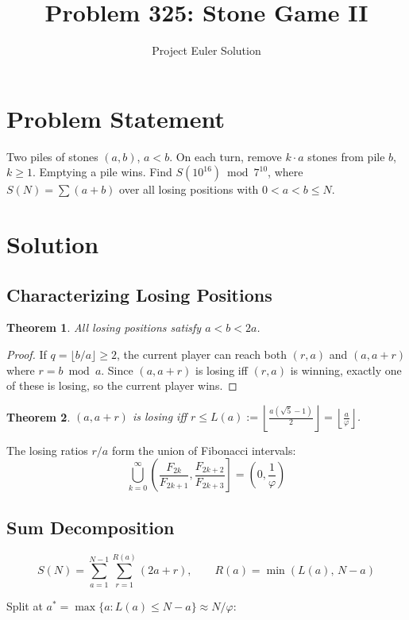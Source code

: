 \documentclass[12pt]{article}
\title{Problem 325: Stone Game II}
\author{Project Euler Solution}
\date{}
\newtheorem{theorem}{Theorem}
\theoremstyle{definition}
\begin{document}
\maketitle

\section{Problem Statement}
Two piles of stones $(a, b)$, $a < b$. On each turn, remove $k \cdot a$ stones from pile $b$, $k \ge 1$. Emptying a pile wins. Find $S(10^{16}) \bmod 7^{10}$, where $S(N) = \sum (a+b)$ over all losing positions with $0 < a < b \le N$.

\section{Solution}

\subsection{Characterizing Losing Positions}

\begin{theorem}
All losing positions satisfy $a < b < 2a$.
\end{theorem}
\begin{proof}
If $q = \lfloor b/a \rfloor \ge 2$, the current player can reach both $(r, a)$ and $(a, a+r)$ where $r = b \bmod a$. Since $(a, a+r)$ is losing iff $(r, a)$ is winning, exactly one of these is losing, so the current player wins.
\end{proof}

\begin{theorem}
$(a, a+r)$ is losing iff $r \le L(a) := \left\lfloor \frac{a(\sqrt{5}-1)}{2} \right\rfloor = \left\lfloor \frac{a}{\varphi} \right\rfloor$.
\end{theorem}

The losing ratios $r/a$ form the union of Fibonacci intervals:
\[
\bigcup_{k=0}^{\infty} \left(\frac{F_{2k}}{F_{2k+1}}, \frac{F_{2k+2}}{F_{2k+3}}\right] = \left(0, \frac{1}{\varphi}\right)
\]

\subsection{Sum Decomposition}

\[
S(N) = \sum_{a=1}^{N-1} \sum_{r=1}^{R(a)} (2a + r), \qquad R(a) = \min\!\left(L(a),\, N-a\right)
\]

Split at $a^* = \max\{a : L(a) \le N - a\} \approx N/\varphi$:
\end{document}
